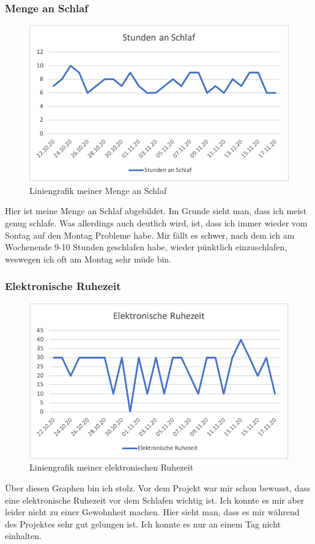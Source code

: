 \subsubsection{Menge an Schlaf}
\begin{figure}[!ht]
  \centering
  \includegraphics[width=0.6\linewidth]{./images/schlaf_jonas.png}
  \caption{Liniengrafik meiner Menge an Schlaf}
  \label{fig:schlaf_jonas}
\end{figure}
Hier ist meine Menge an Schlaf abgebildet. Im Grunde sieht man, dass ich meist genug schlafe. Was allerdings auch deutlich wird, ist, dass ich immer wieder vom Sontag auf den Montag Probleme habe. Mir fällt es schwer, nach dem ich am Wochenende 9-10 Stunden geschlafen habe, wieder pünktlich einzuschlafen, weswegen ich oft am Montag sehr müde bin.
\pagebreak
\subsubsection{Elektronische Ruhezeit}
\begin{figure}[!ht]
  \centering
  \includegraphics[width=0.6\linewidth]{./images/ruhezeit_jonas.png}
  \caption{Liniengrafik meiner elektronischen Ruhezeit}
  \label{fig:ruhezeit_jonas}
\end{figure}
Über diesen Graphen bin ich stolz. Vor dem Projekt war mir schon bewusst, dass eine elektronische Ruhezeit vor dem Schlafen wichtig ist. Ich konnte es mir aber leider nicht zu einer Gewohnheit machen. Hier sieht man, dass es mir während des Projektes sehr gut gelungen ist. Ich konnte es nur an einem Tag nicht einhalten.
